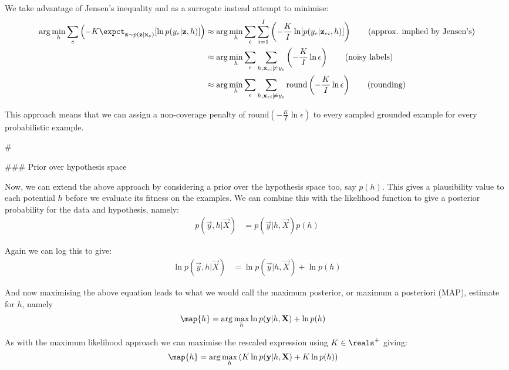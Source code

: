 We take advantage of Jensen's inequality and as a surrogate instead attempt to minimise:
\begin{align}
\arg\min_{h} \sum_e \left( -K \expct_{\vec{z} \sim p(\vec{z}| \vec{x}_e)}[\ln  p(y_e|\vec{z},h)] \right)
& \approx
\arg\min_{h} \sum_e \sum_{i=1}^I  \left(-\frac{K}{I}  \ln  [p(y_e|\vec{z}_{ei},h)] \right)
\tag{approx. implied by Jensen's} \\
& \approx
\arg\min_{h} \sum_e \sum_{h,\vec{x}_{ei}\not\models y_e}  \left(-\frac{K}{I} \ln  \epsilon \right)
\tag{noisy labels}\\
& \approx
\arg\min_{h} \sum_e \sum_{h,\vec{x}_{ei}\not\models y_e}  \text{round}\left(-\frac{K}{I} \ln  \epsilon \right)
\tag{rounding}
\end{align}

This approach means that we can assign a non-coverage penalty of $\text{round}\left(-\frac{K}{I} \ln  \epsilon \right)$ to every sampled grounded example for every probabilistic example.


#%

### Prior over hypothesis space

Now, we can extend the above approach by considering a prior over the hypothesis space too, say $p(h)$. This gives a plausibility value to each potential $h$ before we evaluate its fitness on the examples. We can combine this with the likelihood function to give a posterior probability for the data and hypothesis, namely:
\begin{align}
p(\vec{y}, h|\vec{X})
& = p(\vec{y}|h, \vec{X})p(h)
\end{align}

Again we can log this to give:
\begin{align}
\ln p(\vec{y}, h|\vec{X})
& = \ln p(\vec{y}|h, \vec{X}) + \ln p(h)
\end{align}

And now maximising the above equation leads to what we would call the maximum posterior, or maximum a posteriori (MAP),  estimate for $h$, namely
\begin{align}
\map{h}
& = \arg\max_{h} \ln p(\vec{y}|h, \vec{X}) + \ln p(h) 
\end{align}

As with the maximum likelihood approach we can maximise the rescaled expression using $K \in \reals^+$ giving:
\begin{align}
\map{h}
& = \arg\max_{h} \left(K\ln p(\vec{y}|h, \vec{X}) + K\ln p(h) \right)
\end{align}

